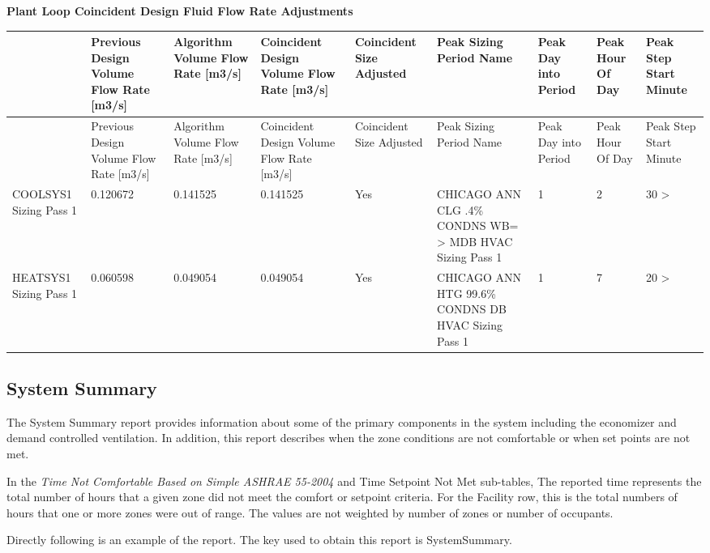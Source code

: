 \textbf{Plant Loop Coincident Design Fluid Flow Rate Adjustments}

{\scriptsize
\begin{longtable}[c]{>{\raggedright}p{0.66in}>{\raggedright}p{0.66in}>{\raggedright}p{0.66in}>{\raggedright}p{0.66in}>{\raggedright}p{0.66in}>{\raggedright}p{0.66in}>{\raggedright}p{0.66in}>{\raggedright}p{0.66in}>{\raggedright}p{0.66in}}
\toprule 
 & Previous Design Volume Flow Rate [m3/s] & Algorithm Volume Flow Rate [m3/s] & Coincident Design Volume Flow Rate [m3/s] & Coincident Size Adjusted & Peak Sizing Period Name & Peak Day into Period & Peak Hour Of Day & Peak Step Start Minute \tabularnewline
\midrule
\endfirsthead

\toprule 
 & Previous Design Volume Flow Rate [m3/s] & Algorithm Volume Flow Rate [m3/s] & Coincident Design Volume Flow Rate [m3/s] & Coincident Size Adjusted & Peak Sizing Period Name & Peak Day into Period & Peak Hour Of Day & Peak Step Start Minute \tabularnewline
\midrule
\endhead

COOLSYS1 Sizing Pass 1 & 0.120672 & 0.141525 & 0.141525 & Yes & CHICAGO ANN CLG .4\% CONDNS WB= > MDB HVAC Sizing Pass 1 & 1 & 2 & 30 > \tabularnewline
HEATSYS1 Sizing Pass 1 & 0.060598 & 0.049054 & 0.049054 & Yes & CHICAGO ANN HTG 99.6\% CONDNS DB HVAC Sizing Pass 1 & 1 & 7 & 20 > \tabularnewline
\bottomrule
\end{longtable}}

\subsection{System Summary}\label{system-summary}

The System Summary report provides information about some of the primary components in the system including the economizer and demand controlled ventilation. In addition, this report describes when the zone conditions are not comfortable or when set points are not met.

In the \emph{Time Not Comfortable Based on Simple ASHRAE 55-2004} and Time Setpoint Not Met sub-tables, The reported time represents the total number of hours that a given zone did not meet the comfort or setpoint criteria. For the Facility row, this is the total numbers of hours that one or more zones were out of range. The values are not weighted by number of zones or number of occupants.

Directly following is an example of the report. The key used to obtain this report is SystemSummary.

